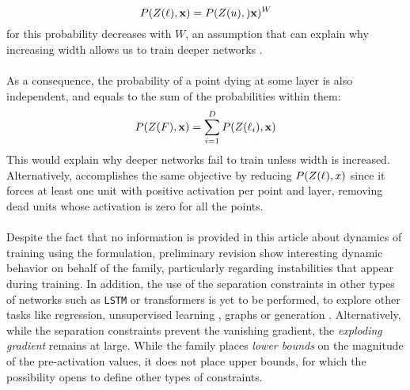 \begin{equation}
    P(Z(\ell), \mathbf{x}) = P(Z(u), )\mathbf{x})^W
\end{equation} 
for this probability decreases with $W$, an assumption that can explain why increasing width allows us to train deeper networks \cite{simpnet, densenet}. 
\\\\
As a consequence, the probability of a point dying at some layer is also independent, and equals to the sum of the probabilities within them:
\begin{equation}
    P(Z(F), \mathbf{x}) = \sum_{i=1}^D P(Z(\ell_i), \mathbf{x})
\end{equation}
This would explain why deeper networks fail to train unless width is increased. Alternatively, \SepUnitPoint accomplishes the same objective by reducing $P(Z(\ell), x)$ since it forces at least one unit with positive activation per point and layer, removing dead units whose activation is zero for all the points.
\\\\
Despite the fact that no information is provided in this article about dynamics of training using the \SepConstraint formulation, preliminary revision show interesting dynamic behavior on behalf of the \SepConstraint family, particularly regarding instabilities that appear during training. In addition, the use of the separation constraints in other types of networks such as \texttt{LSTM} \cite{lstm} or transformers \cite{transformer}\cite{transformer2} is yet to be performed, to explore other tasks like regression, unsupervised learning \cite{embedding}, graphs \cite{graph} or generation \cite{gan,vae}. Alternatively, while the separation constraints prevent the vanishing gradient, the \emph{exploding gradient} remains at large. While the \SepConstraint family places \emph{lower bounds} on the magnitude of the pre-activation values, it does not place upper bounds, for which the possibility opens to define other types of constraints. 







